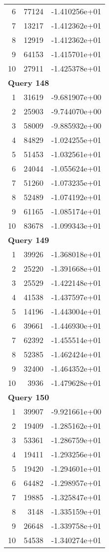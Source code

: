 \begin{longtable}[{p}]{@{}rrp{}@{}}
6 & 77124 & -1.410256e+01 \\
7 & 13217 & -1.412362e+01 \\
8 & 12919 & -1.412362e+01 \\
9 & 64153 & -1.415701e+01 \\
10 & 27911 & -1.425378e+01 \\
\midrule
\multicolumn{3}{l}{\bfseries Query 148} \\
1 & 31619 & -9.681907e+00 \\
2 & 25903 & -9.744070e+00 \\
3 & 58009 & -9.885932e+00 \\
4 & 84829 & -1.024255e+01 \\
5 & 51453 & -1.032561e+01 \\
6 & 24044 & -1.055624e+01 \\
7 & 51260 & -1.073235e+01 \\
8 & 52489 & -1.074192e+01 \\
9 & 61165 & -1.085174e+01 \\
10 & 83678 & -1.099343e+01 \\
\midrule
\multicolumn{3}{l}{\bfseries Query 149} \\
1 & 39926 & -1.368018e+01 \\
2 & 25220 & -1.391668e+01 \\
3 & 25529 & -1.422148e+01 \\
4 & 41538 & -1.437597e+01 \\
5 & 14196 & -1.443004e+01 \\
6 & 39661 & -1.446930e+01 \\
7 & 62392 & -1.455514e+01 \\
8 & 52385 & -1.462424e+01 \\
9 & 32400 & -1.464352e+01 \\
10 & 3936 & -1.479628e+01 \\
\midrule
\multicolumn{3}{l}{\bfseries Query 150} \\
1 & 39907 & -9.921661e+00 \\
2 & 19409 & -1.285162e+01 \\
3 & 53361 & -1.286759e+01 \\
4 & 19411 & -1.293256e+01 \\
5 & 19420 & -1.294601e+01 \\
6 & 64482 & -1.298957e+01 \\
7 & 19885 & -1.325847e+01 \\
8 & 3148 & -1.335159e+01 \\
9 & 26648 & -1.339758e+01 \\
10 & 54538 & -1.340274e+01 \\
\end{longtable}
